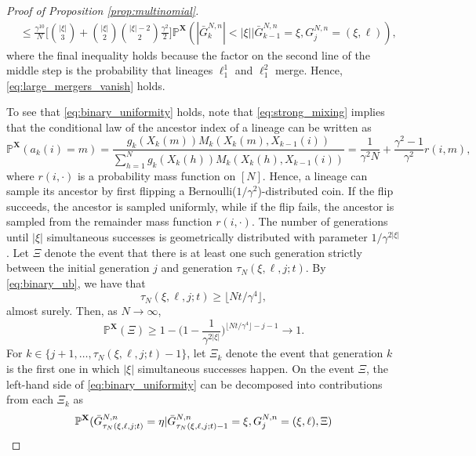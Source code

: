 \documentclass[a4paper,11pt]{article}
\theoremstyle{definition}
\newcommand{\bbP}{\mathbb{P}}
\newcommand{\bfX}{\mathbf{X}}
\begin{document}
\begin{proof}[Proof of Proposition \ref{prop:multinomial}]
\begin{align}
&\leq \frac{ \gamma^{ 10 } }{ N } \Bigg[ \binom{ | \xi | }{ 3 }+ \binom{ | \xi | }{ 2 } \binom{  | \xi | - 2 }{ 2 } \frac{ \gamma^2 }{ 2 } \Bigg] \bbP^{ \bfX }( | \bar{ G }_k^{ N, n } | < | \xi | | \bar{ G }_{ k - 1 }^{ N, n } = \xi, G_j^{ N, n } = ( \xi, \ell ) ), \label{eq:lower_order}
\end{align}
where the final inequality holds because the factor on the second line of the middle step is the probability that lineages $\ell_1^1$ and $\ell_1^2$ merge.
Hence, \eqref{eq:large_mergers_vanish} holds.

To see that \eqref{eq:binary_uniformity} holds, note that \eqref{eq:strong_mixing} implies that the conditional law of the ancestor index of a lineage can be written as
\begin{equation*}
\bbP^{ \bfX }( a_k( i ) = m ) = \frac{ g_k( X_k( m ) ) M_k( X_k( m ), X_{ k - 1 }( i ) ) }{ \sum_{ h = 1 }^N g_k( X_k( h ) ) M_k( X_k( h ), X_{ k - 1 }( i ) ) } = \frac{ 1 }{ \gamma^2 N } + \frac{ \gamma^2 - 1 }{ \gamma^2 } r( i, m ),
\end{equation*}
where $r( i, \cdot )$ is a probability mass function on $[ N ]$.
Hence, a lineage can sample its ancestor by first flipping a Bernoulli($1 / \gamma^2$)-distributed coin.
If the flip succeeds, the ancestor is sampled uniformly, while if the flip fails, the ancestor is sampled from the remainder mass function $r( i, \cdot )$.
The number of generations until $| \xi |$ simultaneous successes is geometrically distributed with parameter $1 / \gamma^{ 2 | \xi | }$.
Let $\Xi$ denote the event that there is at least one such generation strictly between the initial generation $j$ and generation $\tau_N( \xi, \ell, j; t )$.
By \eqref{eq:binary_ub}, we have that
\begin{equation*}
\tau_N( \xi, \ell, j; t ) \geq \lfloor  N t / \gamma^4 \rfloor,
\end{equation*}
almost surely.
Then, as $N \to \infty$,
\begin{equation*}
\bbP^{ \bfX }( \Xi ) \geq 1 - \Bigg(1 - \frac{ 1 }{ \gamma^{ 2 | \xi | } } \Bigg)^{ \lfloor N t / \gamma^4 \rfloor - j - 1 } \to 1.
\end{equation*}
For $k \in \{j + 1, \ldots, \tau_N(\xi, \ell, j; t) - 1\}$, let $\Xi_k$ denote the event that generation $k$ is the first one in which $|\xi|$ simultaneous successes happen.
On the event $\Xi$, the left-hand side of \eqref{eq:binary_uniformity} can be decomposed into contributions from each $\Xi_k$ as
\begin{align}
&\bbP^{ \bfX }( \bar{ G }_{ \tau_N( \xi, \ell, j; t ) }^{ N, n } = \eta | \bar{ G }_{ \tau_N( \xi, \ell, j; t ) - 1 }^{ N, n } = \xi, G_j^{ N, n } = ( \xi, \ell ), \Xi ) \notag \\

\end{align}
\end{proof}
\end{document}
